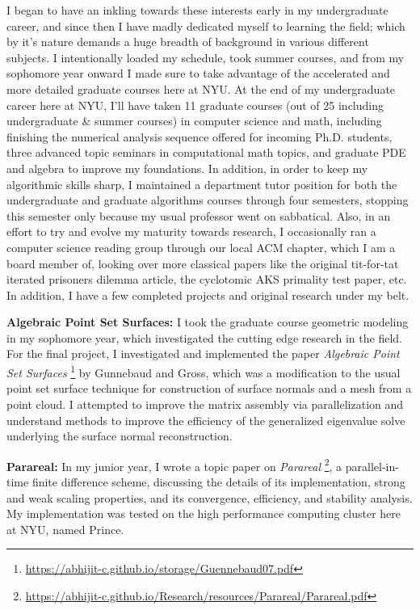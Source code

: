 \documentclass[11pt]{article}
\begin{document}
I began to have an inkling towards these interests early in my undergraduate
career, and since then I have madly dedicated myself to learning the field;
which by it's nature demands a huge breadth of background in various different
subjects. I intentionally loaded my schedule, took summer courses, and from my
sophomore year onward I made sure to take advantage of the accelerated and more
detailed graduate courses here at NYU. At the end of my undergraduate career
here at NYU, I'll have taken 11 graduate courses (out of 25 including
undergraduate \& summer courses) in computer science and math, including
finishing the numerical analysis sequence offered for incoming Ph.D. students,
three advanced topic seminars in computational math topics, and graduate PDE and
algebra to improve my foundations. In addition, in order to keep my algorithmic
skills sharp, I maintained a department tutor position for both the
undergraduate and graduate algorithms courses through four semesters, stopping
this semester only because my usual professor went on sabbatical. Also, in an
effort to try and evolve my maturity towards research, I occasionally ran
a computer science reading group through our local ACM chapter, which I am
a board member of, looking over more classical papers like the original
tit-for-tat iterated prisoners dilemma article, the cyclotomic AKS primality
test paper, etc. In addition, I have a few completed projects and original
research under my belt.

{\bf Algebraic Point Set Surfaces:} I took the graduate course geometric
modeling in my sophomore year, which investigated the cutting edge research in
the field. For the final project, I investigated and implemented the paper {\em
Algebraic Point Set Surfaces}%
\footnote{\url{https://abhijit-c.github.io/storage/Guennebaud07.pdf}}
by Gunnebaud and Gross, which was a modification
to the usual point set surface technique for construction of surface normals and
a mesh from a point cloud. I attempted to improve the matrix assembly via
parallelization and understand methods to improve the efficiency of the
generalized eigenvalue solve underlying the surface normal reconstruction.

{\bf Parareal:} In my junior year, I wrote a topic paper on {\em Parareal}%
\footnote{\url{https://abhijit-c.github.io/Research/resources/Parareal/Parareal.pdf}},
a parallel-in-time finite difference scheme, discussing the details of its
implementation, strong and weak scaling properties, and its convergence,
efficiency, and stability analysis. My implementation was tested on the high
performance computing cluster here at NYU, named Prince.
\end{document}
